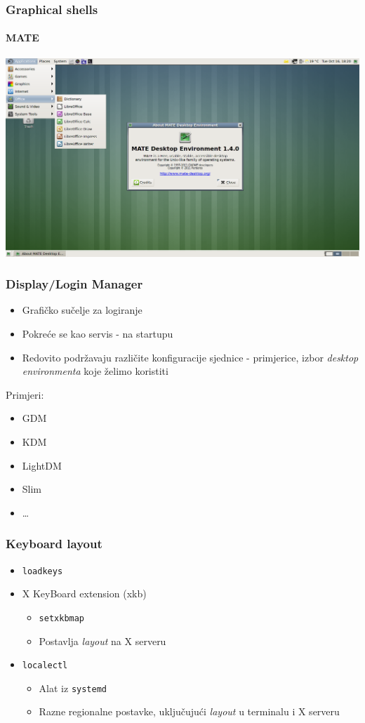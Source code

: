 \documentclass[t,table,usenames,dvipsnames]{beamer}
\begin{document}
\begin{frame}
	\frametitle{Graphical shells}
	\framesubtitle{MATE}
	\includegraphics[width=\textwidth]{mate.png}
\end{frame}


\begin{frame}
	\frametitle{Display/Login Manager}
	\begin{itemize}
		\item Grafičko sučelje za logiranje
		\item Pokreće se kao servis - na startupu
		\item Redovito podržavaju različite konfiguracije sjednice - primjerice, izbor \textit{desktop environmenta} koje želimo koristiti
	\end{itemize}
	\vfill
	Primjeri:
	\begin{itemize}
		\item GDM
		\item KDM
		\item LightDM
		\item Slim
		\item \ldots
	\end{itemize}
\end{frame}


\begin{frame}
	\frametitle{Keyboard layout}
	\begin{itemize}
		\item \texttt{loadkeys}
		\item X KeyBoard extension (xkb)
		\begin{itemize}
			\item[] \texttt{setxkbmap}
			\item[] Postavlja \textit{layout} na X serveru
		\end{itemize}
		\item \texttt{localectl}
		\begin{itemize}
			\item Alat iz \texttt{systemd}
			\item Razne regionalne postavke, uključujući \textit{layout} u terminalu i X serveru
		\end{itemize}
	\end{itemize}
\end{frame}
\end{document}
